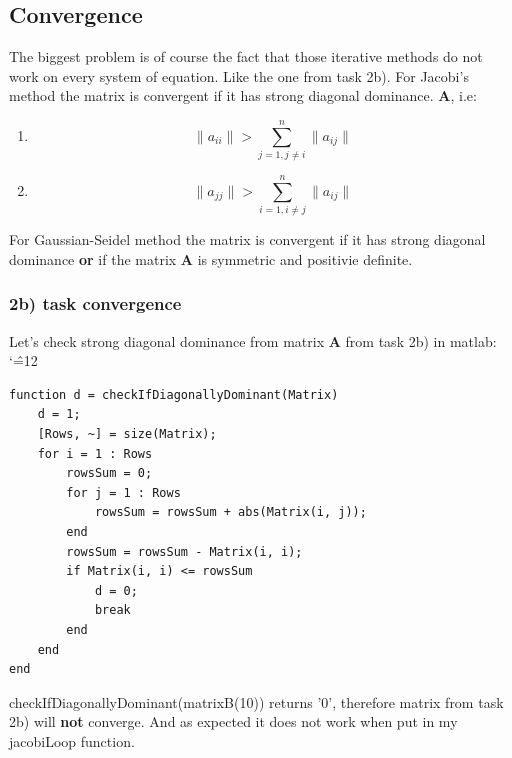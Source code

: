 \documentclass[12pt]{report}
\newenvironment{simplechar}{%
   \catcode`\^=12
}{}
\begin{document}
\newpage
\subsection{Convergence}
The biggest problem is of course the fact that those iterative methods do not work on every system of equation. Like the one from task 2b).
For Jacobi's method the matrix is convergent if it has strong diagonal dominance. \textbf{A}, i.e:
\begin{enumerate}
  \item \[ \| a_{ii} \| > \sum^n_{j=1, j \neq i} \|a_{ij} \| \]
  \item \[ \| a_{jj} \| > \sum^n_{i=1, i \neq j} \|a_{ij} \| \]
\end{enumerate}
For Gaussian-Seidel method the matrix is convergent if it has strong diagonal dominance \textbf{or} if the matrix \textbf{A} is symmetric and positivie definite.
\subsubsection{2b) task convergence }
Let's check strong diagonal dominance from matrix \textbf{A} from task 2b) in matlab:
\begin{simplechar}
\begin{lstlisting}
function d = checkIfDiagonallyDominant(Matrix)
    d = 1;
    [Rows, ~] = size(Matrix);
    for i = 1 : Rows
        rowsSum = 0;
        for j = 1 : Rows
            rowsSum = rowsSum + abs(Matrix(i, j));
        end
        rowsSum = rowsSum - Matrix(i, i);
        if Matrix(i, i) <= rowsSum
            d = 0;
            break
        end
    end
end
\end{lstlisting}
\end{simplechar}
checkIfDiagonallyDominant(matrixB(10)) returns '0', therefore matrix from task 2b) will \textbf{not} converge. And as expected it does not work when put in my jacobiLoop function.
\end{document}
